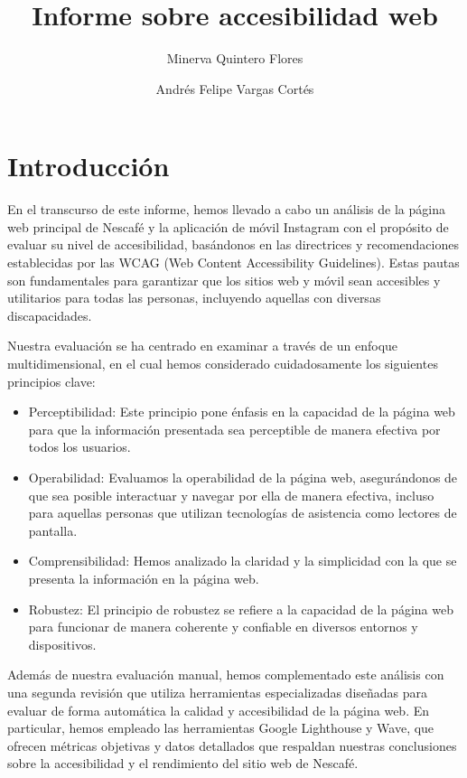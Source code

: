 \documentclass{article}
\title{Informe sobre accesibilidad web}
\author{ Minerva Quintero Flores \and Andrés Felipe Vargas Cortés}
\begin{document}
\maketitle

\section{Introducción}

En el transcurso de este informe, hemos llevado a cabo un análisis de la página web principal de Nescafé y la aplicación de móvil Instagram con el propósito de evaluar su nivel de accesibilidad, basándonos en las directrices y recomendaciones establecidas por las WCAG (Web Content Accessibility Guidelines). Estas pautas son fundamentales para garantizar que los sitios web y móvil sean accesibles y utilitarios para todas las personas, incluyendo aquellas con diversas discapacidades.

Nuestra evaluación se ha centrado en examinar a través de un enfoque multidimensional, en el cual hemos considerado cuidadosamente los siguientes principios clave:

\begin{itemize}
    \item Perceptibilidad: Este principio pone énfasis en la capacidad de la página web para que la información presentada sea perceptible de manera efectiva por todos los usuarios.

    \item Operabilidad: Evaluamos la operabilidad de la página web, asegurándonos de que sea posible interactuar y navegar por ella de manera efectiva, incluso para aquellas personas que utilizan tecnologías de asistencia como lectores de pantalla. 
    \item Comprensibilidad: Hemos analizado la claridad y la simplicidad con la que se presenta la información en la página web. 
    \item Robustez: El principio de robustez se refiere a la capacidad de la página web para funcionar de manera coherente y confiable en diversos entornos y dispositivos.
\end{itemize}

Además de nuestra evaluación manual, hemos complementado este análisis con una segunda revisión que utiliza herramientas especializadas diseñadas para evaluar de forma automática la calidad y accesibilidad de la página web. En particular, hemos empleado las herramientas Google Lighthouse y Wave, que ofrecen métricas objetivas y datos detallados que respaldan nuestras conclusiones sobre la accesibilidad y el rendimiento del sitio web de Nescafé.
\end{document}
